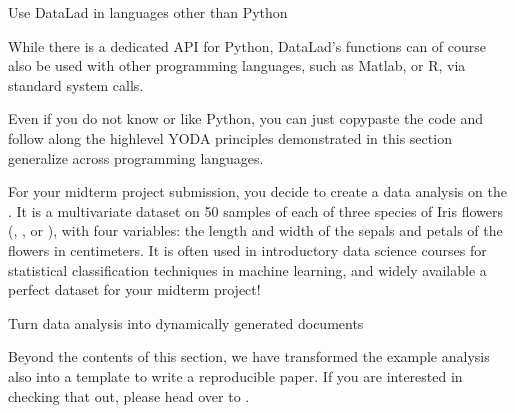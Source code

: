 \ignorespaces \begin{importantnote}[label={index-1}, before title={\thetcbcounter\ }, check odd page=true]{Use DataLad in languages other than Python}
\label{\detokenize{basics/101-130-yodaproject:index-1}}

\sphinxAtStartPar
While there is a dedicated API for Python, DataLad’s functions can of course
also be used with other programming languages, such as Matlab, or R, via standard
system calls.

\sphinxAtStartPar
Even if you do not know or like Python, you can just copy\sphinxhyphen{}paste the code
and follow along \textendash{} the high\sphinxhyphen{}level YODA principles demonstrated in this
section generalize across programming languages.


\end{importantnote}

\sphinxAtStartPar
For your midterm project submission, you decide to create a data analysis on the
.
It is a multivariate dataset on 50 samples of each of three species of Iris
flowers (, , or ), with four variables: the length and width of the sepals and petals
of the flowers in centimeters. It is often used in introductory data science
courses for statistical classification techniques in machine learning, and
widely available \textendash{} a perfect dataset for your midterm project!

\ignorespaces \begin{importantnote}[label={index-2}, before title={\thetcbcounter\ }, check odd page=true]{Turn data analysis into dynamically generated documents}
\label{\detokenize{basics/101-130-yodaproject:index-2}}

\sphinxAtStartPar
Beyond the contents of this section, we have transformed the example analysis also into a template to write a reproducible paper.
If you are interested in checking that out, please head over to .


\end{importantnote}


